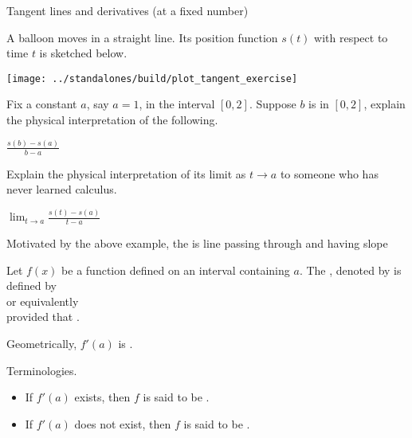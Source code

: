 \documentclass[../main.tex]{subfiles}
\begin{document}
\begin{lesson}{Tangent lines and derivatives (at a fixed number)}

  A balloon moves in a straight line. Its position function \(s(t)\) with respect to time \(t\) is sketched below. 

  \begin{center}
    \texttt{[image: ../standalones/build/plot\_tangent\_exercise]}
  \end{center}

  Fix a constant \(a\), say \(a = 1\), in the interval \([0,2]\). Suppose \(b\) is in \([0,2]\), explain the physical interpretation of the following. 

  \(\frac{s(b) - s(a)}{b - a}\)

  Explain the physical interpretation of its limit as \(t \to a\) to someone who has never learned calculus. 

  \(\lim_{t \to a} \frac{s(t) - s(a)}{t - a}\)

  Motivated by the above example, the  is \underline{\hspace{2cm}} line passing through \underline{\hspace{2in}} and having slope 

  \begin{mdframed}[style=simple]
    Let \(f(x)\) be a function defined on an \underline{\hspace{1in}} interval containing \(a\). The , denoted by  is defined by
    \begin{equation}\label{eq:def-derivative-1}
    \end{equation}
    or equivalently 
    \begin{equation}\label{eq:def-derivative-2}
    \end{equation}
    provided that \underline{\hspace{2in}}.

  \end{mdframed}

  \faStar{} Geometrically, \(f'(a)\) is \underline{\hspace{5in}}.

  Terminologies. 
  \begin{itemize}
    \item If \(f'(a)\) exists, then \(f\) is said to be .
    \item If \(f'(a)\) does not exist, then \(f\) is said to be .
  \end{itemize}


\end{lesson}
\end{document}

